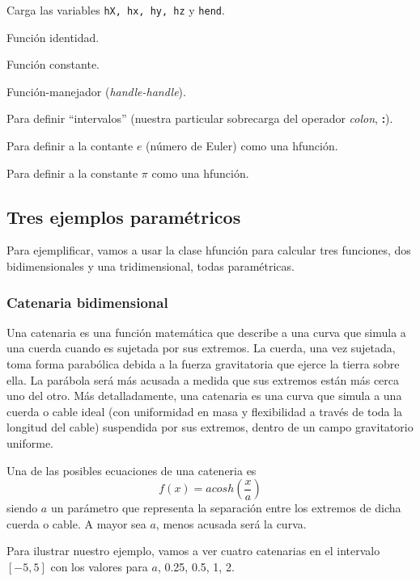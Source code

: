 \documentclass{article}
\begin{document}
\begin{description}[font=\normalfont\ttfamily]
\item[loadPack] Carga las variables \texttt{hX, hx, hy, hz} y
  \texttt{hend}.
\item[hv] Función identidad.
\item[hc] Función constante.
\item[hh] Función-manejador (\textit{handle-handle}).
\item[hc] Para definir ``intervalos'' (nuestra particular sobrecarga del
  operador \textit{colon}, \textbf{:}).
\item[he] Para definir a la contante $e$ (número de Euler) como una hfunción.
\item[pi] Para definir a la constante $\pi$ como una hfunción.
\end{description}

\subsection{Tres ejemplos paramétricos}
\label{ssec:samples}
Para ejemplificar, vamos a usar la clase hfunción para calcular tres
funciones, dos bidimensionales y una tridimensional, todas
paramétricas.

\subsubsection{Catenaria bidimensional}
Una catenaria es una función matemática que describe a una curva que simula a una
cuerda cuando es sujetada por sus extremos. La cuerda, una vez
sujetada, toma forma parabólica debida a la fuerza gravitatoria que
ejerce la tierra sobre ella. La parábola será más acusada a medida que
sus extremos están más cerca uno del otro. Más detalladamente, una
catenaria es una curva que simula a una cuerda o cable ideal
(con uniformidad en masa y flexibilidad a través de toda la longitud
del cable) suspendida por sus extremos, dentro de un campo gravitatorio
uniforme.

Una de las posibles ecuaciones de una cateneria es \[ f(x) =
a cosh(\frac{x}{a}) \] siendo $a$ un parámetro que representa la
separación entre los extremos de dicha cuerda o cable. A mayor sea
$a$, menos acusada será la curva.

Para ilustrar nuestro ejemplo, vamos a ver cuatro catenarias en el
intervalo $[-5, 5]$ con los valores para $a$, 0.25, 0.5, 1, 2.

\end{document}
